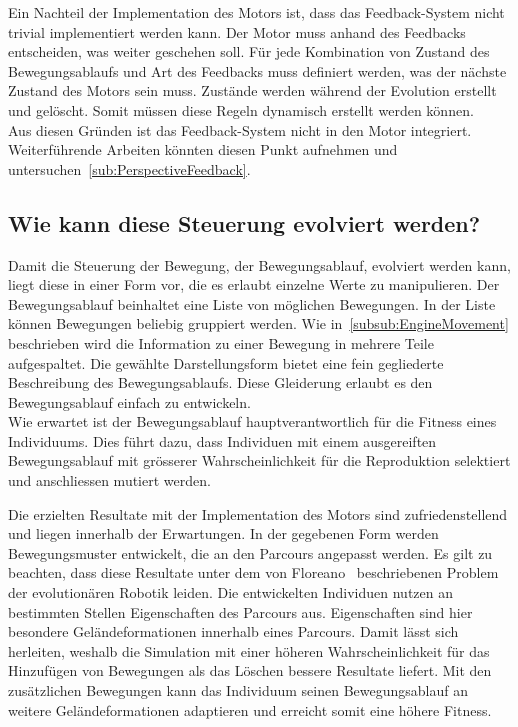       \smallskip

      Ein Nachteil der Implementation des Motors ist, dass das Feedback-System nicht trivial implementiert werden kann.
      Der Motor muss anhand des Feedbacks entscheiden, was weiter geschehen soll.
      Für jede Kombination von Zustand des Bewegungsablaufs und Art des Feedbacks muss definiert werden,
      was der nächste Zustand des Motors sein muss.
      Zustände werden während der Evolution erstellt und gelöscht.
      Somit müssen diese Regeln dynamisch erstellt werden können.
      \\
      Aus diesen Gründen ist das Feedback-System nicht in den Motor integriert.
      Weiterführende Arbeiten könnten diesen Punkt aufnehmen und untersuchen~\vref{sub:PerspectiveFeedback}.

    \subsection{Wie kann diese Steuerung evolviert werden?\label{sub:wieStEv}}

      Damit die Steuerung der Bewegung, der Bewegungsablauf, evolviert werden kann, liegt diese in einer Form vor,
      die es erlaubt einzelne Werte zu manipulieren.
      Der Bewegungsablauf beinhaltet eine Liste von möglichen Bewegungen.
      In der Liste können Bewegungen beliebig gruppiert werden.
      Wie in~\vref{subsub:EngineMovement} beschrieben
      wird die Information zu einer Bewegung in mehrere Teile aufgespaltet.
      Die gewählte Darstellungsform bietet eine fein gegliederte Beschreibung des Bewegungsablaufs.
      Diese Gleiderung erlaubt es den Bewegungsablauf einfach zu entwickeln.
      \\
      Wie erwartet ist der Bewegungsablauf hauptverantwortlich für die Fitness eines Individuums.
      Dies führt dazu, dass Individuen mit einem ausgereiften Bewegungsablauf mit grösserer Wahrscheinlichkeit
      für die Reproduktion selektiert und anschliessen mutiert werden.

      \smallskip

      Die erzielten Resultate mit der Implementation des Motors sind zufriedenstellend und
      liegen innerhalb der Erwartungen.
      In der gegebenen Form werden Bewegungsmuster entwickelt, die an den Parcours angepasst werden.
      Es gilt zu beachten, dass diese Resultate unter dem von Floreano~\cite{Floreano2010} beschriebenen Problem
      der evolutionären Robotik leiden.
      Die entwickelten Individuen nutzen an bestimmten Stellen Eigenschaften des Parcours aus.
      Eigenschaften sind hier besondere Geländeformationen innerhalb eines Parcours.
      Damit lässt sich herleiten, weshalb die Simulation mit einer höheren Wahrscheinlichkeit
      für das Hinzufügen von Bewegungen als das Löschen bessere Resultate liefert.
      Mit den zusätzlichen Bewegungen kann das Individuum seinen Bewegungsablauf
      an weitere Geländeformationen adaptieren und erreicht somit eine höhere Fitness.

